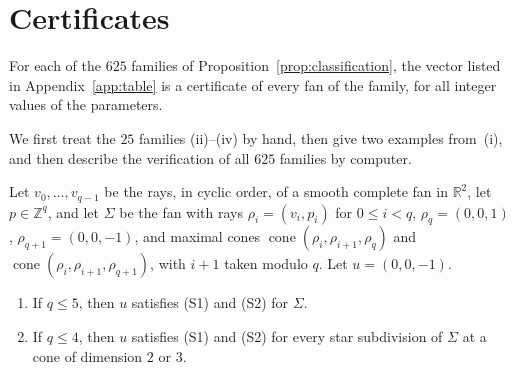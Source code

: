 \documentclass[12pt]{article}
\newcommand{\R}{\mathbb{R}}
\newcommand{\Z}{\mathbb{Z}}
\newcommand{\cone}{\operatorname{cone}}
\begin{document}
\section{Certificates}\label{sec:certificates}

\begin{proposition}\label{prop:certificates}
For each of the $625$ families of Proposition~\ref{prop:classification}, the vector listed in Appendix~\ref{app:table} is a certificate of every fan of the family, for all integer values of the parameters.
\end{proposition}

We first treat the $25$ families (ii)--(iv) by hand, then give two examples from~(i), and then describe the verification of all $625$ families by computer.

\begin{lemma}\label{lem:bundles}
Let $v_0,\dots,v_{q-1}$ be the rays, in cyclic order, of a smooth complete fan in $\R^2$, let $p\in\Z^q$, and let $\Sigma$ be the fan with rays $\rho_i=(v_i,p_i)$ for $0\le i<q$, $\rho_q=(0,0,1)$, $\rho_{q+1}=(0,0,-1)$, and maximal cones $\cone(\rho_i,\rho_{i+1},\rho_q)$ and $\cone(\rho_i,\rho_{i+1},\rho_{q+1})$, with $i+1$ taken modulo $q$. Let $u=(0,0,-1)$.
\begin{enumerate}
\item[(a)] If $q\le5$, then $u$ satisfies (S1) and (S2) for $\Sigma$.
\item[(b)] If $q\le4$, then $u$ satisfies (S1) and (S2) for every star subdivision of $\Sigma$ at a cone of dimension $2$ or $3$.
\end{enumerate}
\end{lemma}
\end{document}
